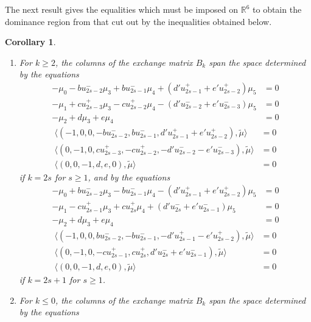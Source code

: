 \documentclass{amsart}
\newtheorem{corollary}[theorem]{Corollary}
\numberwithin{theorem}{section}
\newcommand{\RR}{\mathbb{R}}
\begin{document}

  The next result gives the equalities which must be imposed on $\RR^6$ to obtain the dominance region from that cut out by the inequalities obtained below.
  \begin{corollary}\mbox{}
    \begin{enumerate}
      \item For $k\ge2$, the columns of the exchange matrix $B_k$ span the space determined by the equations
        \begin{align*}
          -\mu_0 - b u_{2s-2}^- \mu_3 + b u_{2s-1}^- \mu_4 + (d' u_{2s-1}^+ + e' u_{2s-2}^+) \mu_5 &= 0\\
          -\mu_1 + c u_{2s-3}^+ \mu_3 - c u_{2s-2}^+ \mu_4 - (d' u_{2s-2}^- + e' u_{2s-3}^-) \mu_5 &= 0\\
          -\mu_2 + d \mu_3 + e \mu_4 &= 0
        \end{align*}
        \begin{align*}
          \langle (-1,0,0, -b u_{2s-2}^-, b u_{2s-1}^-, d' u_{2s-1}^+ + e' u_{2s-2}^+), \tilde\mu \rangle &= 0\\
          \langle (0,-1,0, c u_{2s-3}^+, -c u_{2s-2}^+, -d' u_{2s-2}^- - e' u_{2s-3}^-), \tilde\mu \rangle &= 0\\
          \langle (0,0,-1, d, e, 0),\tilde\mu \rangle &= 0
        \end{align*}
        if $k=2s$ for $s \ge 1$, and by the equations
        \begin{align*}
          -\mu_0 + b u_{2s-2}^- \mu_3 - b u_{2s-1}^- \mu_4 - (d' u_{2s-1}^+ + e' u_{2s-2}^+) \mu_5 &= 0\\
          -\mu_1 - c u_{2s-1}^+ \mu_3 + c u_{2s}^+ \mu_4 + (d' u_{2s}^- + e' u_{2s-1}^-) \mu_5 &= 0\\
          -\mu_2 + d \mu_3 + e \mu_4 &= 0
        \end{align*}
        \begin{align*}
          \langle (-1,0,0, b u_{2s-2}^-, -b u_{2s-1}^-, -d' u_{2s-1}^+ - e' u_{2s-2}^+), \tilde\mu \rangle &= 0\\
          \langle (0,-1,0, -c u_{2s-1}^+, c u_{2s}^+, d' u_{2s}^- + e' u_{2s-1}^-), \tilde\mu \rangle &= 0\\
          \langle (0,0,-1, d, e, 0), \tilde\mu \rangle &= 0
        \end{align*}
        if $k=2s+1$ for $s \ge 1$.
      \item For $k\le0$, the columns of the exchange matrix $B_k$ span the space determined by the equations

\end{enumerate}
\end{corollary}
\end{document}
